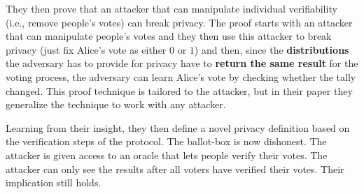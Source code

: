 \documentclass{article}
\begin{document}
They then prove that an attacker that can manipulate individual verifiability (i.e., remove people's votes) can break privacy. The proof starts with an attacker that can manipulate people's votes and they then use this attacker to break privacy (just fix Alice's vote as either $0$ or $1$) and then, since the \textbf{distributions} the adversary has to provide for privacy have to \textbf{return the same result} for the voting process, the adversary can learn Alice's vote by checking whether the tally changed. This proof technique is tailored to the attacker, but in their paper they generalize the technique to work with any attacker.

Learning from their insight, they then define a novel privacy definition based on the verification steps of the protocol. The ballot-box is now dishonest. The attacker is given access to an oracle that lets people verify their votes. The attacker can only see the results after all voters have verified their votes. Their implication still holds.















\end{document}
